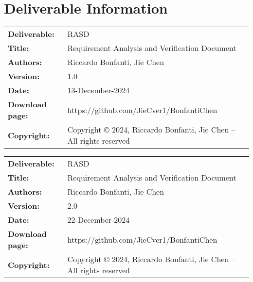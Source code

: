\documentclass{util/polimi_3i}
\begin{document}
\chapter*{Deliverable Information} 
\begin{table}[h!]
    \begin{tabu} to \textwidth { X[0.3,r,p] X[0.7,l,p] }
    \hline
    \textbf{Deliverable:} & RASD\\
    \textbf{Title:} & Requirement Analysis and Verification Document \\
    \textbf{Authors:} & Riccardo Bonfanti, Jie Chen \\
    \textbf{Version:} & 1.0 \\ 
    \textbf{Date:} & 13-December-2024 \\
    \textbf{Download page:} & https://github.com/JieCver1/BonfantiChen \\
    \textbf{Copyright:} & Copyright © 2024, Riccardo Bonfanti, Jie Chen – All rights reserved \\
    \hline
    \end{tabu}
    \end{table}
    \begin{table}[h!]
        \begin{tabu} to \textwidth { X[0.3,r,p] X[0.7,l,p] }
        \hline
        \textbf{Deliverable:} & RASD\\
        \textbf{Title:} & Requirement Analysis and Verification Document \\
        \textbf{Authors:} & Riccardo Bonfanti, Jie Chen \\
        \textbf{Version:} & 2.0 \\ 
        \textbf{Date:} & 22-December-2024 \\
        \textbf{Download page:} & https://github.com/JieCver1/BonfantiChen \\
        \textbf{Copyright:} & Copyright © 2024, Riccardo Bonfanti, Jie Chen – All rights reserved \\
        \hline
        \end{tabu}
        \end{table}
    
    \setcounter{page}{2}
    
    \newpage
\end{document}
